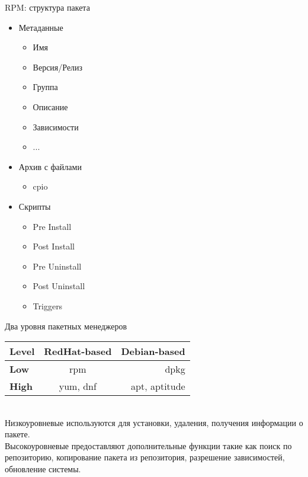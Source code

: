 \begin{frame}{RPM: структура пакета}
	\begin{itemize}
		\item Метаданные
			\begin{itemize}
				\item Имя
				\item Версия/Релиз
				\item Группа
				\item Описание
                                \item Зависимости
				\item ...
			\end{itemize}
		\item Архив с файлами
			\begin{itemize}
				\item cpio
			\end{itemize}
		\item Скрипты
			\begin{itemize}
				\item Pre Install
				\item Post Install
				\item Pre Uninstall
				\item Post Uninstall \bigskip
				\item Triggers
			\end{itemize}
	\end{itemize}
\end{frame}

\begin{frame}{Два уровня пакетных менеджеров}

\begin{tabular}{| l | c | r |}
      \hline
          Level &  RedHat-based & Debian-based \\ 
      \hline
          {\bf Low} & rpm & dpkg \\ 
      \hline
          {\bf High} & yum, dnf & apt, aptitude \\
      \hline
    \end{tabular}
    \\


    \alert{Низкоуровневые} используются для установки, удаления, получения информации о пакете. \\
    \alert{Высокоуровневые} предоставляют дополнительные функции такие как поиск по репозиторию, копирование пакета из репозитория, разрешение зависимостей, обновление системы.

\end{frame}
